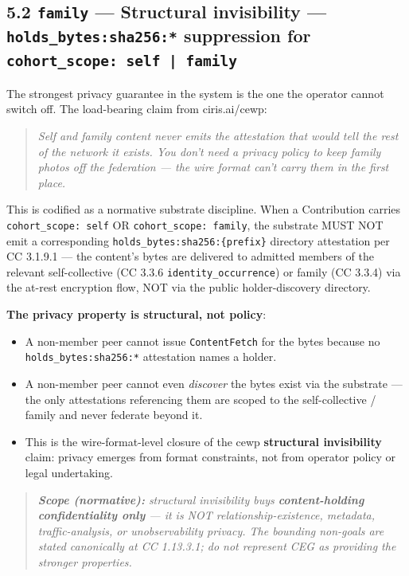 \documentclass[11pt]{article}
\begin{document}
\subsection*{5.2 \texttt{family} — Structural invisibility — \texttt{holds\_bytes:sha256:*} suppression for \texttt{cohort\_scope: self | family}}


The strongest privacy guarantee in the system is the one the operator cannot switch off. The load-bearing claim from ciris.ai/cewp:


\begin{quote}\itshape Self and family content never emits the attestation that would tell the rest of the network it exists. You don't need a privacy policy to keep family photos off the federation — the wire format can't carry them in the first place.\end{quote}


This is codified as a normative substrate discipline. When a Contribution carries \texttt{cohort\_scope: self} OR \texttt{cohort\_scope: family}, the substrate MUST NOT emit a corresponding \texttt{holds\_bytes:sha256:\{prefix\}} directory attestation per CC 3.1.9.1 — the content's bytes are delivered to admitted members of the relevant self-collective (CC 3.3.6 \texttt{identity\_occurrence}) or family (CC 3.3.4) via the at-rest encryption flow, NOT via the public holder-discovery directory.


\textbf{The privacy property is structural, not policy}:


\begin{itemize}\setlength\itemsep{0pt}
\item A non-member peer cannot issue \texttt{ContentFetch} for the bytes because no \texttt{holds\_bytes:sha256:*} attestation names a holder.
\item A non-member peer cannot even \textit{discover} the bytes exist via the substrate — the only attestations referencing them are scoped to the self-collective / family and never federate beyond it.
\item This is the wire-format-level closure of the cewp \textbf{structural invisibility} claim: privacy emerges from format constraints, not from operator policy or legal undertaking.
\end{itemize}


\begin{quote}\itshape \textbf{Scope (normative):} structural invisibility buys \textbf{content-holding confidentiality only} — it is NOT relationship-existence, metadata, traffic-analysis, or unobservability privacy. The bounding non-goals are stated canonically at CC 1.13.3.1; do not represent CEG as providing the stronger properties.\end{quote}
\end{document}
